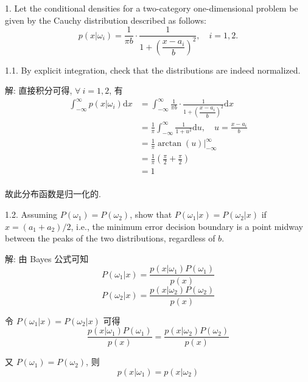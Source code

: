 \documentclass[openany]{ctexbook}
\theoremstyle{kaiti}
\theoremstyle{normal}
\begin{document}
1. Let the conditional densities for a two-category one-dimensional problem be given by the Cauchy distribution described as follows:
\begin{equation}
  p(x|\omega_i)=\frac{1}{\pi b} \cdot \frac{1}{1+\left(\dfrac{x-a_i}{b}\right)^2},\quad  i=1,2.
\end{equation}

1.1. By explicit integration, check that the distributions are indeed normalized.

解: 直接积分可得, $\forall~i=1,2$, 有
\begin{equation}
  \begin{aligned}
    \int_{-\infty}^{\infty}p(x|\omega_i)\mathrm{d}x
    &=\int_{-\infty}^{\infty}\frac{1}{\pi b} \cdot \frac{1}{1+\left(\dfrac{x-a_i}{b}\right)^2}\mathrm{d}x \\
    &=\frac{1}{\pi}\int_{-\infty}^{\infty}\frac{1}{1+u^2}\mathrm{d}u,\quad u=\frac{x-a_i}{b} \\
    &=\frac{1}{\pi}\arctan(u)\Big|_{-\infty}^{\infty} \\
    &=\frac{1}{\pi}\left(\frac{\pi}{2}+\frac{\pi}{2}\right)\\
    &=1\\
  \end{aligned}
\end{equation}

故此分布函数是归一化的.

1.2. Assuming $P(\omega_1) = P(\omega_2)$, show that $P(\omega_1|x)=P(\omega_2|x)$ if $x=(a_1+a_2)/2$, i.e., the minimum error decision boundary is a point midway between the peaks of the two distributions, regardless of $b$.

解: 由 Bayes 公式可知
\begin{equation}
  P(\omega_1|x)=\frac{p(x|\omega_1)P(\omega_1)}{p(x)}
\end{equation}
\begin{equation}
  P(\omega_2|x)=\frac{p(x|\omega_2)P(\omega_2)}{p(x)}
\end{equation}

令 $P(\omega_1|x)=P(\omega_2|x)$ 可得
\begin{equation}
  \frac{p(x|\omega_1)P(\omega_1)}{p(x)}=\frac{p(x|\omega_2)P(\omega_2)}{p(x)}
\end{equation}

又 $P(\omega_1) = P(\omega_2)$, 则
\begin{equation}
  p(x|\omega_1)=p(x|\omega_2)
\end{equation}
\end{document}
